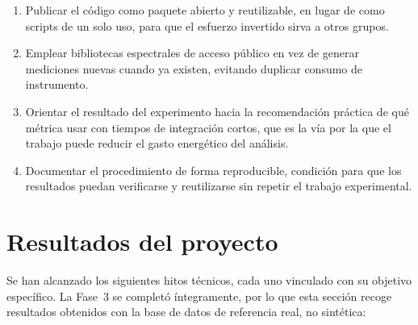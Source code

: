 \begin{enumerate}
    \item Publicar el código como paquete abierto y reutilizable, en lugar de como scripts de un solo uso, para que el esfuerzo invertido sirva a otros grupos.
    \item Emplear bibliotecas espectrales de acceso público en vez de generar mediciones nuevas cuando ya existen, evitando duplicar consumo de instrumento.
    \item Orientar el resultado del experimento hacia la recomendación práctica de qué métrica usar con tiempos de integración cortos, que es la vía por la que el trabajo puede reducir el gasto energético del análisis.
    \item Documentar el procedimiento de forma reproducible, condición para que los resultados puedan verificarse y reutilizarse sin repetir el trabajo experimental.
\end{enumerate}

\section{Resultados del proyecto}

Se han alcanzado los siguientes hitos técnicos, cada uno vinculado con su objetivo específico. La Fase~3 se completó íntegramente, por lo que esta sección recoge resultados obtenidos con la base de datos de referencia real, no sintética:

